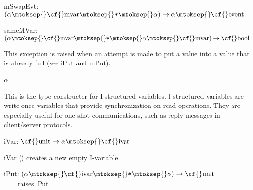 \begin{interface}
\Nopagebreak
\item {}{} {\cf mSwapEvt: \((\alpha\mtoksep{}\mbox{\cf{}mvar}\mtoksep{}\verb,*,\mtoksep{}\alpha)\rightarrow \alpha\mtoksep{}\mbox{\cf{}event}\)}

\Nopagebreak
\item {}{} {\cf sameMVar: \((\alpha\mtoksep{}\mbox{\cf{}mvar}\mtoksep{}\verb,*,\mtoksep{}\alpha\mtoksep{}\mbox{\cf{}mvar})\rightarrow \mbox{\cf{}bool}\)}

\end{interface}

\begin{descr}
\item {}{} \label{exn-SYNC_VAR.Put}


\begin{speccomment}
\item 

	This exception is raised when an attempt is made to put a 	value into a value that is already full (see {\cf \small i\-Put} and 	{\cf \small m\-Put}).     \end{speccomment}
\item {}{} \(\alpha\)~\label{ty-SYNC_VAR.ivar}

\begin{speccomment}
\item 

	This is the type constructor for I-structured variables. 	I-structured variables are write-once variables that provide 	synchronization on read operations. 	They are especially useful for one-shot communications, such 	as reply messages in client/server protocols.     \end{speccomment}
\item {}{} {\cf iVar: \(\mbox{\cf{}unit}\rightarrow \alpha\mtoksep{}\mbox{\cf{}ivar}\)}\label{val-SYNC_VAR.iVar}


\begin{speccomment}
\item {\cf \small i\-Var ()           } 
creates a new empty I-variable.     \end{speccomment}
\item {}{} {\cf iPut: \((\alpha\mtoksep{}\mbox{\cf{}ivar}\mtoksep{}\verb,*,\mtoksep{}\alpha)\rightarrow \mbox{\cf{}unit}\)}\label{val-SYNC_VAR.iPut}\linebreak[3]\hspace*{\fill}\mbox{~~~~\textrm{raises}~{\cf Put}}



\end{descr}
